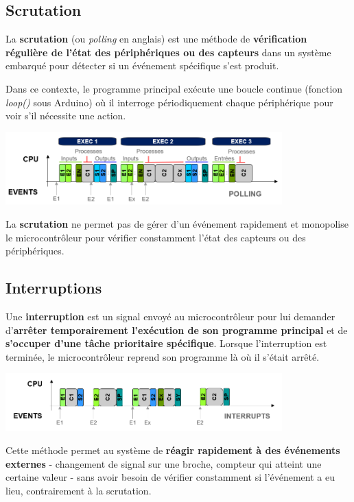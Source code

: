 \documentclass[a4paper,11pt,titlepage]{article} %
\begin{document}
\subsection{Scrutation}

La \textbf{scrutation} (ou \textit{polling} en anglais) est une méthode de \textbf{vérification régulière de l'état des périphériques ou des capteurs} dans un système embarqué pour détecter si un événement spécifique s'est produit. 

Dans ce contexte, le programme principal exécute une boucle continue (fonction \textsl{loop()} sous Arduino) où il interroge périodiquement chaque périphérique pour voir s'il nécessite une action. 

\begin{center}
	\includegraphics[width=0.8\textwidth]{images/gen_polling.png}
\end{center}

La \textbf{scrutation} ne permet pas de gérer d'un événement rapidement et monopolise le microcontrôleur pour vérifier constamment l'état des capteurs ou des périphériques.


\subsection{Interruptions}

Une \textbf{interruption} est un signal envoyé au microcontrôleur pour lui demander d'\textbf{arrêter temporairement l'exécution de son programme principal} et de \textbf{s'occuper d'une tâche prioritaire spécifique}. Lorsque l'interruption est terminée, le microcontrôleur reprend son programme là où il s'était arrêté.

\begin{center}
	\includegraphics[width=0.8\textwidth]{images/gen_isr.png}
\end{center}


Cette méthode permet au système de \textbf{réagir rapidement à des événements externes} - changement de signal sur une broche, compteur qui atteint une certaine valeur - sans avoir besoin de vérifier constamment si l'événement a eu lieu, contrairement à la scrutation. 
\end{document}

